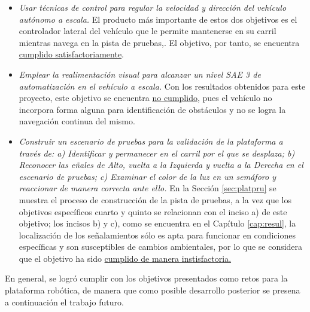 \begin{itemize}
	\item {\it Usar técnicas de control para regular la velocidad y dirección del vehículo autónomo a escala.} El producto más importante de estos dos objetivos es el controlador lateral del vehículo que le permite mantenerse en su carril mientras navega en la pista de pruebas,. El objetivo, por tanto, se encuentra \underline{cumplido satisfactoriamente}.
	\item {\it Emplear la realimentación visual para alcanzar un nivel SAE 3 de automatización \cite{saeTaxonomyDefinitiosTerms2014} en el vehículo a escala.} Con los resultados obtenidos para este proyecto, este objetivo se encuentra \underline{no cumplido}, pues el vehículo no incorpora forma alguna para identificación de obstáculos y no se logra la navegación continua del mismo.
	\item {\it Construir un escenario de pruebas para la validación de la plataforma a través de: a) Identificar y permanecer en el carril por el que se desplaza; b) Reconocer las eñales de Alto, vuelta a la Izquierda y vuelta a la Derecha en el escenario de pruebas; c) Examinar el color de la luz en un semáforo y reaccionar de manera correcta ante ello.} En la Sección \ref{sec:platpru} se muestra el proceso de construcción de la pista de pruebas, a la vez que los objetivos específicos cuarto y quinto se relacionan con el inciso a) de este objetivo; los incisos b) y c), como se encuentra en el Capítulo \ref{cap:resul}, la localización de los señalamientos sólo es apta para funcionar en condiciones específicas y son susceptibles de cambios ambientales, por lo que se considera que el objetivo ha sido \underline{cumplido de manera instisfactoria.}
\end{itemize}
En general, se logró cumplir con los objetivos presentados como retos para la plataforma robótica, de manera que como posible desarrollo posterior se presena a continuación el trabajo futuro.
